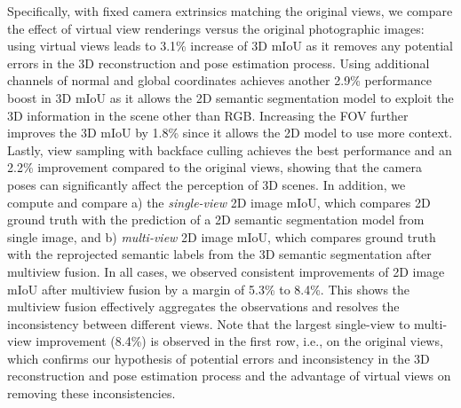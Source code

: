 \documentclass[runningheads]{llncs}
\begin{document}
Specifically, with fixed camera extrinsics matching the original views, we compare the effect of virtual view renderings versus the original photographic images: using virtual views leads to 3.1\% increase of 3D mIoU as it removes any potential errors in the 3D reconstruction and pose estimation process.  Using additional channels of normal and global coordinates achieves another 2.9\% performance boost in 3D mIoU as it allows the 2D semantic segmentation model to exploit the 3D information in the scene other than RGB.  Increasing the FOV further improves the 3D mIoU by 1.8\% since it allows the 2D model to use more context.  Lastly, view sampling with backface culling achieves the best performance and an 2.2\% improvement compared to the original views, showing that the camera poses can significantly affect the perception of 3D scenes. In addition, we compute and compare a) the \textit{single-view} 2D image mIoU,  which compares 2D ground truth with the prediction of a 2D semantic segmentation model from single image, and b) \textit{multi-view} 2D image mIoU, which compares ground truth with the reprojected semantic labels from the 3D semantic segmentation after multiview fusion. In all cases, we observed consistent improvements of 2D image mIoU after multiview fusion by a margin of 5.3\% to 8.4\%. This shows the multiview fusion effectively aggregates the observations and resolves the inconsistency between different views. Note that the largest single-view to multi-view improvement (8.4\%) is observed in the first row, i.e., on the original views, which confirms our hypothesis of potential errors and inconsistency in the 3D reconstruction and pose estimation process and the advantage of virtual views on removing these inconsistencies.
\end{document}

